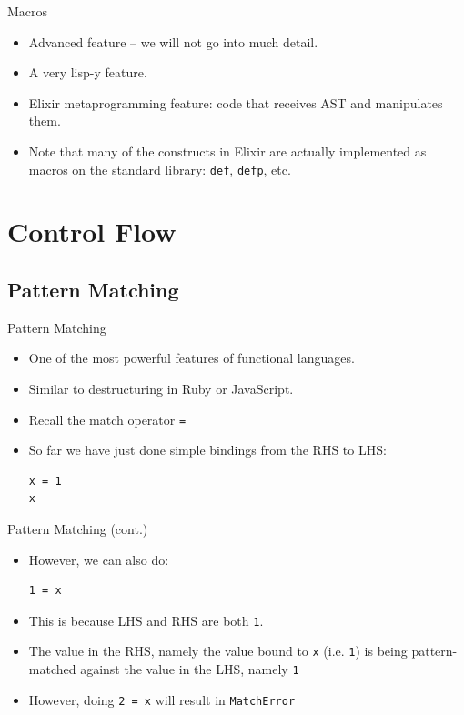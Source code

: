 \documentclass[12pt]{beamer}
\begin{document}
\begin{frame}{Macros}
  \begin{itemize}
    \item Advanced feature -- we will not go into much detail.
    \item A very lisp-y feature.
    \item Elixir metaprogramming feature: code that receives AST and manipulates them.
    \item Note that many of the constructs in Elixir are actually implemented as macros on the standard library: \texttt{def}, \texttt{defp}, etc.
  \end{itemize}
\end{frame}

\section{Control Flow}
\subsection{Pattern Matching}
\begin{frame}[fragile]{Pattern Matching}
  \begin{itemize}
    \item One of the most powerful features of functional languages.
    \item Similar to destructuring in Ruby or JavaScript.
    \item Recall the match operator \texttt{=}
    \item So far we have just done simple bindings from the RHS to LHS:
          \begin{verbatim}
x = 1
x
          \end{verbatim}
  \end{itemize}
\end{frame}

\begin{frame}[fragile]{Pattern Matching (cont.)}
  \begin{itemize}
    \item However, we can also do:
          \begin{verbatim}
1 = x
    \end{verbatim}
    \item This is because LHS and RHS are both \texttt{1}.
    \item The value in the RHS, namely the value bound to \texttt{x} (i.e. \texttt{1}) is being pattern-matched against the value in the LHS, namely \texttt{1}
    \item However, doing \texttt{2 = x} will result in \texttt{MatchError}
  \end{itemize}
\end{frame}
\end{document}
